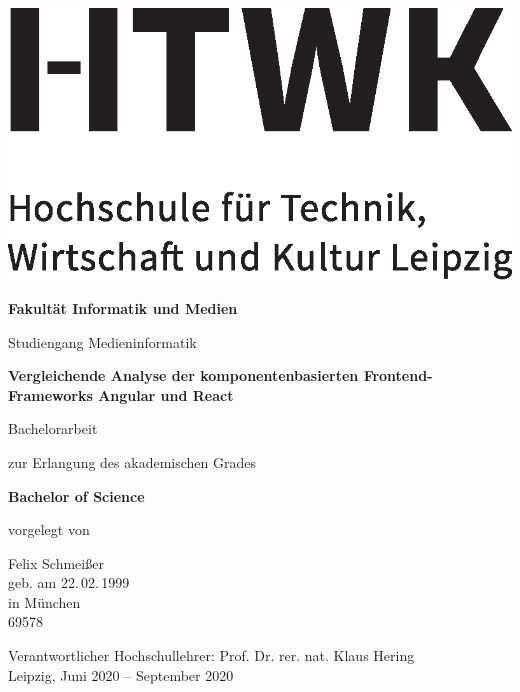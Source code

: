 \begin{titlepage}
{\centering
\includegraphics[scale=0.5]{Hilfsdateien/HTWK_logo.eps}\\
{\large \textbf{Fakultät Informatik und Medien} \par}
{\large Studiengang Medieninformatik \par}
\vspace{1.25cm}
{\Large \textbf{Vergleichende Analyse der komponentenbasierten Frontend-Frameworks Angular und React}\par}
\vspace{1.25cm}
{Bachelorarbeit \par}
{zur Erlangung des akademischen Grades \par} 
{\large  \textbf{Bachelor of Science} \par}
{vorgelegt von \par}
\vspace{1.25cm}
{Felix Schmeißer\\[3ex]
geb. am 22.\,02.\,1999\\[3ex]
in München\\[3ex]
69578 \par}}
\vfill
{\noindent Verantwortlicher Hochschullehrer: Prof. Dr. rer. nat. Klaus Hering\\
Leipzig, Juni 2020 -- September 2020}
\end{titlepage}

